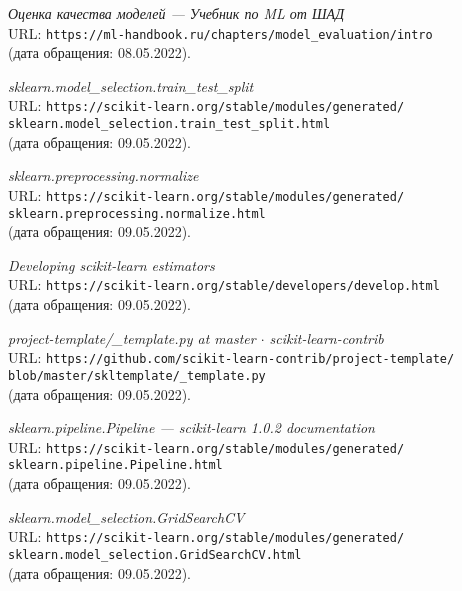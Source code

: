 \begin{thebibliography}{99}    
{\itshape Оценка качества моделей --- Учебник по ML от ШАД}\\
URL: \texttt{https://ml-handbook.ru/chapters/model\_evaluation/intro}\\
(дата обращения: 08.05.2022).

{\itshape sklearn.model\_selection.train\_test\_split}\\
URL: \texttt{https://scikit-learn.org/stable/modules/generated/\\sklearn.model\_selection.train\_test\_split.html}\\
(дата обращения: 09.05.2022).

{\itshape sklearn.preprocessing.normalize}\\
URL: \texttt{https://scikit-learn.org/stable/modules/generated/\\sklearn.preprocessing.normalize.html}\\
(дата обращения: 09.05.2022).

{\itshape Developing scikit-learn estimators}\\
URL: \texttt{https://scikit-learn.org/stable/developers/develop.html}\\
(дата обращения: 09.05.2022).

{\itshape project-template/\_template.py at master $\cdot$ scikit-learn-contrib}\\
URL: \texttt{https://github.com/scikit-learn-contrib/project-template/\\blob/master/skltemplate/\_template.py}\\
(дата обращения: 09.05.2022).

{\itshape sklearn.pipeline.Pipeline --- scikit-learn 1.0.2 documentation}\\
URL: \texttt{https://scikit-learn.org/stable/modules/generated/\\sklearn.pipeline.Pipeline.html}\\
(дата обращения: 09.05.2022).

{\itshape sklearn.model\_selection.GridSearchCV}\\
URL: \texttt{https://scikit-learn.org/stable/modules/generated/\\sklearn.model\_selection.GridSearchCV.html}\\
(дата обращения: 09.05.2022).


\end{thebibliography}
